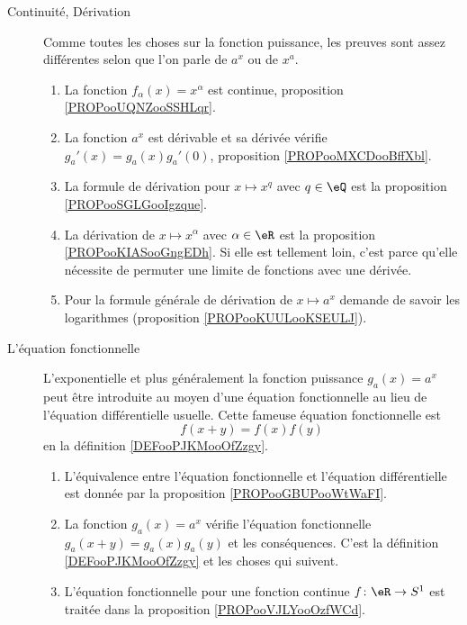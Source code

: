 \begin{description}
	\item[Continuité, Dérivation]
		Comme toutes les choses sur la fonction puissance, les preuves sont assez différentes selon que l'on parle de \( a^x\) ou de \( x^a\).
		\begin{enumerate}
			\item
			      La fonction \( f_{\alpha}(x)=x^{\alpha}\) est continue, proposition \ref{PROPooUQNZooSSHLqr}.
			\item
			      La fonction \( a^x\) est dérivable et sa dérivée vérifie \( g_a'(x)=g_a(x)g_a'(0)\), proposition \ref{PROPooMXCDooBffXbl}.
			\item
			      La formule de dérivation pour \( x\mapsto x^q\) avec \( q\in \eQ\) est la proposition \ref{PROPooSGLGooIgzque}.
			\item
			      La dérivation de \( x\mapsto x^{\alpha}\) avec \( \alpha\in \eR\) est la proposition \ref{PROPooKIASooGngEDh}. Si elle est tellement loin, c'est parce qu'elle nécessite de permuter une limite de fonctions avec une dérivée.
			\item
			      Pour la formule générale de dérivation de \( x\mapsto a^x\) demande de savoir les logarithmes (proposition \ref{PROPooKUULooKSEULJ}).
		\end{enumerate}

	\item[L'équation fonctionnelle]
		L'exponentielle et plus généralement la fonction puissance \( g_a(x)=a^x\) peut être introduite au moyen d'une équation fonctionnelle au lieu de l'équation différentielle usuelle. Cette fameuse équation fonctionnelle est
		\begin{equation}
			f(x+y)=f(x)f(y)
		\end{equation}
		en la définition \ref{DEFooPJKMooOfZzgy}.
		\begin{enumerate}
			\item
			      L'équivalence entre l'équation fonctionnelle et l'équation différentielle est donnée par la proposition \ref{PROPooGBUPooWtWaFI}.
			\item
			      La fonction \( g_a(x)=a^x\) vérifie l'équation fonctionnelle \( g_a(x+y)=g_a(x)g_a(y)\) et les conséquences. C'est la définition \ref{DEFooPJKMooOfZzgy} et les choses qui suivent.
			\item
			      L'équation fonctionnelle pour une fonction continue \( f\colon \eR\to S^1\) est traitée dans la proposition \ref{PROPooVJLYooOzfWCd}.
		\end{enumerate}
\end{description}

